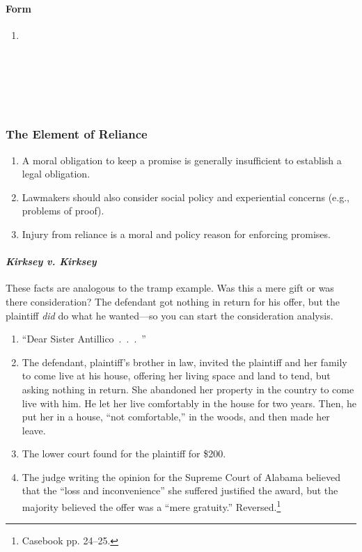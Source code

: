 \paragraph{Form}

\begin{enumerate}
    \item %
    ~\\\\\\\\\\\\
\end{enumerate}

\subsubsection{The Element of Reliance}

\begin{enumerate}
    \item A moral obligation to keep a promise is generally insufficient to 
    establish a legal obligation.
    \item Lawmakers should also consider social policy and experiential 
    concerns (e.g., problems of proof).
    \item Injury from reliance is a moral and policy reason for enforcing 
    promises.
\end{enumerate}

\paragraph{\emph{Kirksey v. Kirksey}}

These facts are analogous to the tramp example. Was this a mere gift or was 
there consideration? The defendant got nothing in return for his offer, but 
the plaintiff \emph{did} do what he wanted---so you can start the 
consideration analysis.

\begin{enumerate}
    \item ``Dear Sister Antillico~.~.~.~''
    \item The defendant, plaintiff's brother in law, invited the plaintiff and 
    her family to come live at his house, offering her living space and land 
    to tend, but asking nothing in return. She abandoned her property in the 
    country to come live with him. He let her live comfortably in the house 
    for two years. Then, he put her in a house, ``not comfortable,'' in the 
    woods, and then made her leave.
    \item The lower court found for the plaintiff for \$200.
    \item The judge writing the opinion for the Supreme Court of Alabama 
    believed that the ``loss and inconvenience'' she suffered justified the 
    award, but the majority believed the offer was a ``mere gratuity.'' 
    Reversed.\footnote{Casebook pp. 24--25.}
\end{enumerate}

